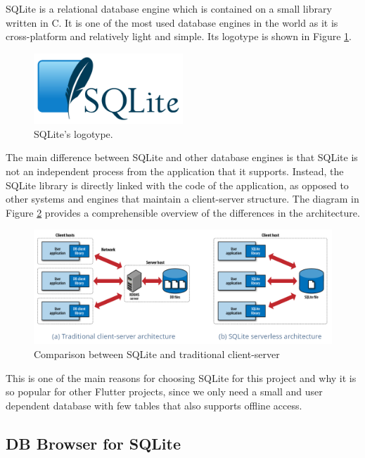 SQLite \cite{noauthor_sqlite_nodate} is a relational database engine which is contained on a small library written in C. It is one of the most used database engines in the world as it is cross-platform and relatively light and simple. Its logotype is shown in Figure \ref{fig:sqlite}.

\begin{figure}[h]
  \centering
  \includegraphics[width=0.5\textwidth]{Figures/sqlite.png}
  \caption{%
    SQLite's logotype.
  }
  \label{fig:sqlite}
\end{figure}

The main difference between SQLite and other database engines is that SQLite is not an independent process from the application that it supports. Instead, the SQLite library is directly linked with the code of the application, as opposed to other systems and engines that maintain a client-server structure. The diagram in Figure \ref{fig:sqlite-architecture} provides a comprehensible overview of the differences in the architecture.

\begin{figure}[h]
  \centering
  \includegraphics[width=\textwidth]{Figures/sqlite-architecture.png}
  \caption{%
    Comparison between SQLite and traditional client-server
  }
  \label{fig:sqlite-architecture}
\end{figure}

This is one of the main reasons for choosing SQLite for this project and why it is so popular for other Flutter projects, since we only need a small and user dependent database with few tables that also supports offline access.

\subsection{DB Browser for SQLite}

